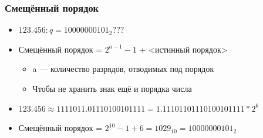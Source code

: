 \documentclass{../../slides-style}
\begin{document}
    \begin{frame}
        \frametitle{Смещённый порядок}
        \begin{itemize}
            \item $123.456:  q = 10000000101_2???$
            \item Смещённый порядок =  $2^{a - 1} - 1$ + <истинный порядок>
            \begin{itemize}
                \item a --- количество разрядов, отводимых под порядок
                \item Чтобы не хранить знак ещё и порядка числа
            \end{itemize}
            \item $123.456 \approx 1111011.01110100101111 = 1.11101101110100101111 * 2^6$
            \item Смещённый порядок = $2^{10} - 1 + 6 = 1029_{10} = 10000000101_2$
        \end{itemize}
    \end{frame}
\end{document}
